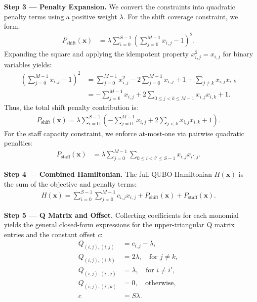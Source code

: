 \documentclass[12pt]{article}
\begin{document}
\textbf{Step 3 --- Penalty Expansion.} We convert the constraints into quadratic penalty terms using a positive weight $\lambda$. For the shift coverage constraint, we form:
\begin{align}
  P_{\text{shift}}(\mathbf{x}) &= \lambda \sum_{i=0}^{S-1} \left( \sum_{j=0}^{M-1} x_{i,j} - 1 \right)^2.
\end{align}
Expanding the square and applying the idempotent property $x_{i,j}^2 = x_{i,j}$ for binary variables yields:
\begin{align}
  \left( \sum_{j=0}^{M-1} x_{i,j} - 1 \right)^2 &= \sum_{j=0}^{M-1} x_{i,j}^2 - 2\sum_{j=0}^{M-1} x_{i,j} + 1 + \sum_{j \neq k} x_{i,j}x_{i,k} \nonumber \\
  &= -\sum_{j=0}^{M-1} x_{i,j} + 2\sum_{0 \le j < k \le M-1} x_{i,j}x_{i,k} + 1.
\end{align}
Thus, the total shift penalty contribution is:
\begin{align}
  P_{\text{shift}}(\mathbf{x}) = \lambda \sum_{i=0}^{S-1} \left( -\sum_{j=0}^{M-1} x_{i,j} + 2\sum_{j < k} x_{i,j}x_{i,k} + 1 \right).
\end{align}
For the staff capacity constraint, we enforce at-most-one via pairwise quadratic penalties:
\begin{align}
  P_{\text{staff}}(\mathbf{x}) &= \lambda \sum_{j=0}^{M-1} \sum_{0 \le i < i' \le S-1} x_{i,j}x_{i',j}.
\end{align}

\textbf{Step 4 --- Combined Hamiltonian.} The full QUBO Hamiltonian $H(\mathbf{x})$ is the sum of the objective and penalty terms:
\begin{align}
  H(\mathbf{x}) = \sum_{i=0}^{S-1} \sum_{j=0}^{M-1} c_{i,j} x_{i,j} + P_{\text{shift}}(\mathbf{x}) + P_{\text{staff}}(\mathbf{x}).
\end{align}

\textbf{Step 5 --- Q Matrix and Offset.} Collecting coefficients for each monomial yields the general closed-form expressions for the upper-triangular Q matrix entries and the constant offset $c$:
\begin{align}
  Q_{(i,j),(i,j)} &= c_{i,j} - \lambda, \\
  Q_{(i,j),(i,k)} &= 2\lambda, \quad \text{for } j \neq k, \\
  Q_{(i,j),(i',j)} &= \lambda, \quad \text{for } i \neq i', \\
  Q_{(i,j),(i',k)} &= 0, \quad \text{otherwise}, \\
  c &= S\lambda.
\end{align}
\end{document}
